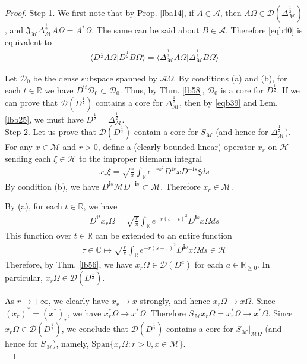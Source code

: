 \documentclass[12pt,b5paper,notitlepage]{article}
\theoremstyle{definition}
\theoremstyle{plain}
\newcommand{\fk}{\mathfrak}
\newcommand{\mc}{\mathcal}
\newcommand{\Dom}{\scr{D}}
\newcommand{\Span}{\mathrm{Span}}
\newcommand{\bk}[1]{\langle {#1}\rangle}
\newcommand{\scr}{\mathscr}
\newcommand{\im}{\mathbf{i}}
\newcommand{\Cbb}{\mathbb C}
\newcommand{\Rbb}{\mathbb R}
\numberwithin{equation}{section}
\begin{document}
\begin{proof}
Step 1. We first note that by  Prop. \ref{lba14}, if $A\in\scr A$, then $A\Omega\in\Dom(\Delta_{\mc M}^{\frac 12})$, and $\fk J_{\mc M}\Delta_{\mc M}^{\frac 12}A\Omega=A^*\Omega$. The same can be said about $B\in\scr A$. Therefore \eqref{eqb40} is equivalent to
\begin{align}\label{eqb39}
\bk{D^{\frac 12}A\Omega|D^{\frac 12}B\Omega}=\bk{\Delta_{\mc M}^{\frac 12}A\Omega|\Delta_{\mc M}^{\frac 12}B\Omega}
\end{align}

Let $\Dom_0$ be the dense subspace spanned by $\scr A\Omega$. By conditions (a) and (b), for each $t\in\Rbb$ we have $D^{\im t}\Dom_0\subset\Dom_0$. Thus, by Thm. \ref{lb58}, $\Dom_0$ is a core for $D^{\frac 12}$. If we can prove that $\Dom(D^{\frac 12})$ contains a core for $\Delta_{\mc M}^{\frac 12}$, then by \eqref{eqb39} and Lem. \ref{lbb25}, we must have $D^{\frac 12}=\Delta_{\mc M}^{\frac 12}$.\\[-1ex]

Step 2. Let us prove that $\Dom(D^{\frac 12})$ contain a core for $S_{\mc M}$ (and hence for $\Delta_{\mc M}^{\frac 12}$). For any $x\in\mc M$ and $r>0$, define a (clearly bounded linear) operator $x_r$ on $\mc H$ sending each $\xi\in\mc H$ to the improper Riemann integral
\begin{align}
x_r\xi=\sqrt{\frac r\pi} \int_\Rbb e^{-rs^2}D^{\im s}xD^{-\im s}\xi ds
\end{align}
By condition (b), we have $D^{\im s}\mc MD^{-\im s}\subset\mc M$. Therefore $x_r\in\mc M$.

By (a), for each $t\in\Rbb$, we have
\begin{align*}
D^{\im t}x_r\Omega=\sqrt{\frac r\pi} \int_\Rbb e^{-r(s-t)^2}D^{\im s}x\Omega ds
\end{align*}
This function over $t\in\Rbb$ can be extended to an entire function
\begin{align*}
\tau\in\Cbb\mapsto \sqrt{\frac r\pi} \int_\Rbb e^{-r(s-\tau)^2}D^{\im s}x\Omega ds\in\mc H
\end{align*}
Therefore, by Thm. \ref{lb56}, we have $x_r\Omega\in\Dom(D^a)$ for each $a\in\Rbb_{\geq0}$. In particular, $x_r\Omega\in\Dom(D^{\frac 12})$. 

As $r\rightarrow+\infty$, we clearly have $x_r\rightarrow x$ strongly, and hence $x_r\Omega\rightarrow x\Omega$. Since $(x_r)^*=(x^*)_r$, we have $x_r^*\Omega\rightarrow x^*\Omega$. Therefore $S_{\mc M}x_r\Omega=x_r^*\Omega\rightarrow x^*\Omega$. Since $x_r\Omega\in\Dom(D^{\frac 12})$, we conclude that $\Dom(D^{\frac 12})$ contains a core for $S_{\mc M}|_{\mc M\Omega}$ (and hence for $S_{\mc M}$), namely, $\Span\{x_r\Omega:r>0,x\in\mc M\}$.\\[-1ex]


\end{proof}
\end{document}
